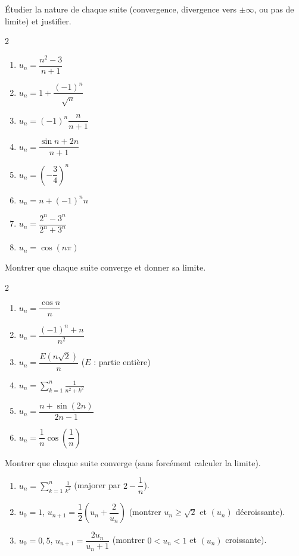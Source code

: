 Étudier la nature de chaque suite (convergence, divergence vers
$\pm\infty$, ou pas de limite) et justifier.
\begin{multicols}{2}
\begin{enumerate}
	\item $u_n=\dfrac{n^{2}-3}{n+1}$
	\item $u_n=1+\dfrac{(-1)^{n}}{\sqrt{n}}$
	\item $u_n=(-1)^{n}\dfrac{n}{n+1}$
	\item $u_n=\dfrac{\sin n+2n}{n+1}$
	\item $u_n=\left(-\dfrac34\right)^{n}$
	\item $u_n=n+(-1)^{n}n$
	\item $u_n=\dfrac{2^{n}-3^{n}}{2^{n}+3^{n}}$
	\item $u_n=\cos(n\pi)$
\end{enumerate}
\end{multicols}

Montrer que chaque suite converge et donner sa limite.
\begin{multicols}{2}
\begin{enumerate}
	\item $u_n=\dfrac{\cos n}{n}$
	\item $u_n=\dfrac{(-1)^{n}+n}{n^{2}}$
	\item $u_n=\dfrac{E(n\sqrt2)}{n}$ \; ($E$ : partie entière)
	\item $u_n=\displaystyle\sum_{k=1}^{n}\frac{1}{n^{2}+k^{2}}$
	\item $u_n=\dfrac{n+\sin(2n)}{2n-1}$
	\item $u_n=\dfrac{1}{n}\cos\!\left(\dfrac{1}{n}\right)$
\end{enumerate}
\end{multicols}

Montrer que chaque suite converge (sans forcément calculer la limite).
\begin{enumerate}
	\item $u_n=\displaystyle\sum_{k=1}^{n}\frac{1}{k^{2}}$ \; (majorer par
	$2-\dfrac1n$).
	\item $u_0=1$, $u_{n+1}=\dfrac{1}{2}\left(u_n+\dfrac{2}{u_n}\right)$
	(montrer $u_n\geq\sqrt2$ et $(u_n)$ décroissante).
	\item $u_0=0{,}5$, $u_{n+1}=\dfrac{2u_n}{u_n+1}$ (montrer
	$0<u_n<1$ et $(u_n)$ croissante).
\end{enumerate}

